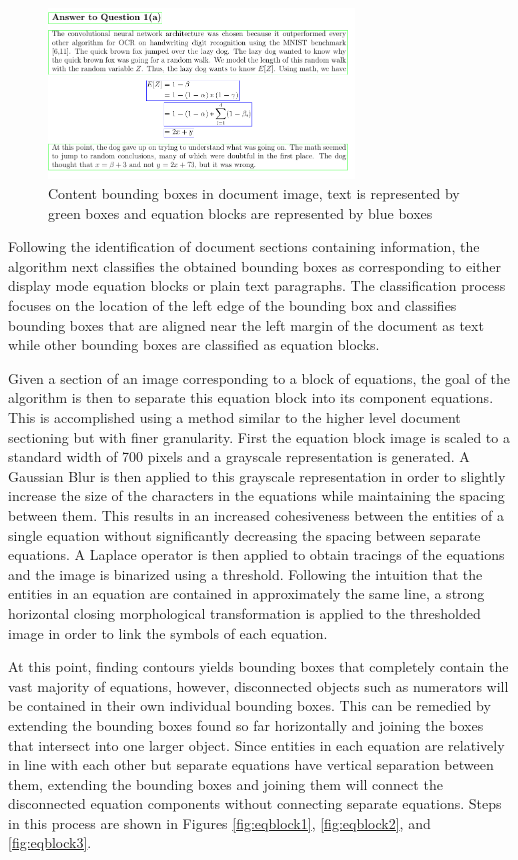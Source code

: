 \documentclass[10pt]{IEEEtran}
\begin{document}
\begin{figure}[h]
  \centering
    \includegraphics[width=3.2in]{paper1-bounds.png}
  \caption{Content bounding boxes in document image, text is represented by green boxes and equation blocks are represented by blue boxes}
  \label{fig:paper3}
\end{figure}

Following the identification of document sections containing information, the algorithm next classifies the obtained bounding boxes as corresponding to either display mode equation blocks or plain text paragraphs. The classification process focuses on the location of the left edge of the bounding box and classifies bounding boxes that are aligned near the left margin of the document as text while other bounding boxes are classified as equation blocks.

Given a section of an image corresponding to a block of equations, the goal of the algorithm is then to separate this equation block into its component equations. This is accomplished using a method similar to the higher level document sectioning but with finer granularity. First the equation block image is scaled to a standard width of 700 pixels and a grayscale representation is generated. A Gaussian Blur is then applied to this grayscale representation in order to slightly increase the size of the characters in the equations while maintaining the spacing between them. This results in an increased cohesiveness between the entities of a single equation without significantly decreasing the spacing between separate equations. A Laplace operator is then applied to obtain tracings of the equations and the image is binarized using a threshold. Following the intuition that the entities in an equation are contained in approximately the same line, a strong horizontal closing morphological transformation is applied to the thresholded image in order to link the symbols of each equation.

At this point, finding contours yields bounding boxes that completely contain the vast majority of equations, however, disconnected objects such as numerators will be contained in their own individual bounding boxes. This can be remedied by extending the bounding boxes found so far horizontally and joining the boxes that intersect into one larger object. Since entities in each equation are relatively in line with each other but separate equations have vertical separation between them, extending the bounding boxes and joining them will connect the disconnected equation components without connecting separate equations. Steps in this process are shown in Figures \ref{fig:eqblock1}, \ref{fig:eqblock2}, and \ref{fig:eqblock3}.
\end{document}
